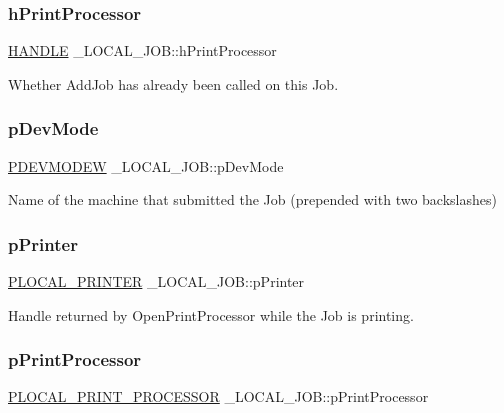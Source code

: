 \subsubsection{\texorpdfstring{h\+Print\+Processor}{hPrintProcessor}}
{\footnotesize\ttfamily \hyperlink{interfacevoid}{H\+A\+N\+D\+LE} \+\_\+\+L\+O\+C\+A\+L\+\_\+\+J\+O\+B\+::h\+Print\+Processor}

Whether Add\+Job has already been called on this Job. \mbox{\label{struct___l_o_c_a_l___j_o_b_ab5b42196180b03ec2e2e4db1374b7013}} 
\subsubsection{\texorpdfstring{p\+Dev\+Mode}{pDevMode}}
{\footnotesize\ttfamily \hyperlink{struct__devicemode_w}{P\+D\+E\+V\+M\+O\+D\+EW} \+\_\+\+L\+O\+C\+A\+L\+\_\+\+J\+O\+B\+::p\+Dev\+Mode}

Name of the machine that submitted the Job (prepended with two backslashes) \mbox{\label{struct___l_o_c_a_l___j_o_b_a70654959e93b2a0b771c301d419f79ad}} 
\subsubsection{\texorpdfstring{p\+Printer}{pPrinter}}
{\footnotesize\ttfamily \hyperlink{struct___l_o_c_a_l___p_r_i_n_t_e_r}{P\+L\+O\+C\+A\+L\+\_\+\+P\+R\+I\+N\+T\+ER} \+\_\+\+L\+O\+C\+A\+L\+\_\+\+J\+O\+B\+::p\+Printer}

Handle returned by Open\+Print\+Processor while the Job is printing. \mbox{\label{struct___l_o_c_a_l___j_o_b_a8bdcc78093b5901b6017a1da84f562d8}} 
\subsubsection{\texorpdfstring{p\+Print\+Processor}{pPrintProcessor}}
{\footnotesize\ttfamily \hyperlink{struct___l_o_c_a_l___p_r_i_n_t___p_r_o_c_e_s_s_o_r}{P\+L\+O\+C\+A\+L\+\_\+\+P\+R\+I\+N\+T\+\_\+\+P\+R\+O\+C\+E\+S\+S\+OR} \+\_\+\+L\+O\+C\+A\+L\+\_\+\+J\+O\+B\+::p\+Print\+Processor}

